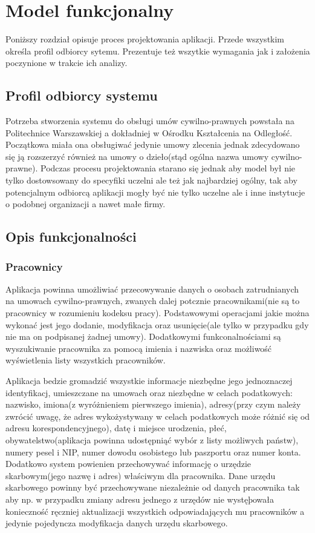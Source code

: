 \chapter{Model funkcjonalny}
Poniższy rozdział opisuje proces projektowania aplikacji. Przede wszystkim określa profil odbiorcy sytemu. Prezentuje też wszytkie wymagania jak i założenia poczynione w trakcie ich analizy.

\section[Profil odbiorcy systemu][Profil odbiorcy systemu]{Profil odbiorcy systemu}
Potrzeba stworzenia systemu do obsługi umów cywilno-prawnych powstała na Politechnice Warszawskiej a dokładniej w Ośrodku Kształcenia na Odległość. Początkowa miała ona obsługiwać jedynie umowy zlecenia jednak zdecydowano się ją rozszerzyć również na umowy o dzieło(stąd ogólna nazwa umowy cywilno-prawne). Podczas procesu projektowania starano się jednak aby model był nie tylko dostowsowany do specyfiki uczelni ale też jak najbardziej ogólny, tak aby potencjalnym odbiorcą aplikacji mogły być nie tylko uczelne ale i inne instytucje o podobnej organizacji a nawet małe firmy.

\section[Opis funkcjonalności][Opis funkcjonalności]{Opis funkcjonalności}

\subsection[Pracownicy][Pracownicy]{Pracownicy}
Aplikacja powinna umożliwiać przecowywanie danych o osobach zatrudnianych na umowach cywilno-prawnych, zwanych dalej potcznie pracownikami(nie są to pracownicy w rozumieniu kodeksu pracy). Podstawowymi operacjami jakie można wykonać jest jego dodanie, modyfikacja oraz usunięcie(ale tylko w przypadku gdy nie ma on podpisanej żadnej umowy). Dodatkowymi funkconalnościami są wyszukiwanie pracownika za pomocą imienia i nazwiska oraz możliwość wyświetlenia listy wszystkich pracowników.

Aplikacja bedzie gromadzić wszystkie informacje niezbędne jego jednoznaczej identyfikacj, umieszczane na umowach oraz niezbędne w celach podatkowych: nazwisko, imiona(z wyróżnieniem pierwszego imienia), adresy(przy czym należy zwrócić uwagę, że adres wykożystywany w celach podatkowych może różnić się od adresu korespondencyjnego), datę i miejsce urodzenia, płeć, obywatelstwo(aplikacja powinna udostępniąć wybór z listy możliwych państw), numery pesel i NIP, numer dowodu osobistego lub paszportu oraz numer konta. Dodatkowo system powienien przechowywać informację o urzędzie skarbowym(jego nazwę i adres) właściwym dla pracownika. Dane urzędu skarbowego powinny być przechowywane niezależnie od danych pracownika tak aby np. w przypadku zmiany adresu jednego z urzędów nie wystęþowała konieczność ręczniej aktualizacji wszystkich odpowiadających mu pracowników a jedynie pojedyncza modyfikacja danych urzędu skarbowego.

%
